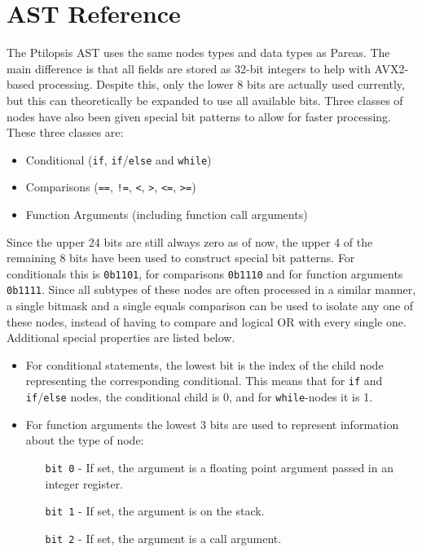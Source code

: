 \documentclass[11pt,dvipsnames]{article}
\newcommand{\icpp}[1]{\texttt{#1}}
\newcommand{\mono}[1]{\texttt{#1}}
\begin{document}
\section{AST Reference} \label{ast}
The Ptilopsis AST uses the same nodes types and data types as Pareas. The main difference is that all fields are stored as 32-bit integers to help with AVX2-based processing. Despite this, only the lower 8 bits are actually used currently, but this can theoretically be expanded to use all available bits. Three classes of nodes have also been given special bit patterns to allow for faster processing. These three classes are:
\begin{itemize}
    \item Conditional (\icpp{if}, \icpp{if}/\icpp{else} and \icpp{while})
    \item Comparisons (\mono{==}, \mono{!=}, \mono{<}, \mono{>}, \mono{<=}, \mono{>=})
    \item Function Arguments (including function call arguments)
\end{itemize}

Since the upper 24 bits are still always zero as of now, the upper 4 of the remaining 8 bits have been used to construct special bit patterns. For conditionals this is \mono{0b1101}, for comparisons \mono{0b1110} and for function arguments \mono{0b1111}. Since all subtypes of these nodes are often processed in a similar manner, a single bitmask and a single equals comparison can be used to isolate any one of these nodes, instead of having to compare and logical OR with every single one. Additional special properties are listed below.
\begin{itemize}
    \item For conditional statements, the lowest bit is the index of the child node representing the corresponding conditional. This means that for \icpp{if} and \icpp{if}/\icpp{else} nodes, the conditional child is 0, and for \icpp{while}-nodes it is 1.
    \item For function arguments the lowest 3 bits are used to represent information about the type of node:
    \begin{itemize}
        \item[\mono{bit 0}] - If set, the argument is a floating point argument passed in an integer register.
        \item[\mono{bit 1}] - If set, the argument is on the stack.
        \item[\mono{bit 2}] - If set, the argument is a call argument.
    \end{itemize}
\end{itemize}
\end{document}
